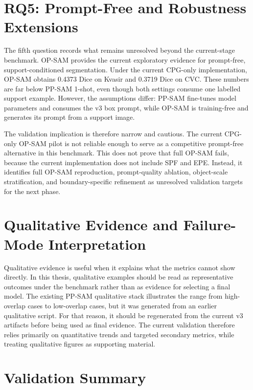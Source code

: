 \section{RQ5: Prompt-Free and Robustness Extensions}
\label{sec:rq5-results}

The fifth question records what remains unresolved beyond the current-stage benchmark. OP-SAM provides the current exploratory evidence for prompt-free, support-conditioned segmentation. Under the current CPG-only implementation, OP-SAM obtains 0.4373 Dice on Kvasir and 0.3719 Dice on CVC. These numbers are far below PP-SAM 1-shot, even though both settings consume one labelled support example. However, the assumptions differ: PP-SAM fine-tunes model parameters and consumes the v3 box prompt, while OP-SAM is training-free and generates its prompt from a support image.

The validation implication is therefore narrow and cautious. The current CPG-only OP-SAM pilot is not reliable enough to serve as a competitive prompt-free alternative in this benchmark. This does not prove that full OP-SAM fails, because the current implementation does not include SPF and EPE. Instead, it identifies full OP-SAM reproduction, prompt-quality ablation, object-scale stratification, and boundary-specific refinement as unresolved validation targets for the next phase.

\section{Qualitative Evidence and Failure-Mode Interpretation}
\label{sec:qualitative-failure-modes}

Qualitative evidence is useful when it explains what the metrics cannot show directly. In this thesis, qualitative examples should be read as representative outcomes under the benchmark rather than as evidence for selecting a final model. The existing PP-SAM qualitative stack illustrates the range from high-overlap cases to low-overlap cases, but it was generated from an earlier qualitative script. For that reason, it should be regenerated from the current v3 artifacts before being used as final evidence. The current validation therefore relies primarily on quantitative trends and targeted secondary metrics, while treating qualitative figures as supporting material.

\section{Validation Summary}
\label{sec:validation-summary}


